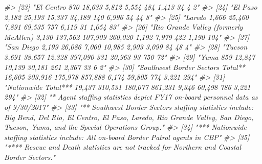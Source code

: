 \documentclass[
  12pt,
]{book}
\newenvironment{Shaded}{\begin{snugshade}}{\end{snugshade}}
\newcommand{\CommentTok}[1]{\textcolor[rgb]{0.37,0.37,0.37}{\textit{#1}}}
\begin{document}
\begin{Shaded}
\begin{Highlighting}[]
\CommentTok{\#\textgreater{} [23] "El Centro                                         870              18,633                    5,812                   5,554             484             1,413             34             4      2"    }
\CommentTok{\#\textgreater{} [24] "El Paso                                          2,182             25,193                   15,337                  34,189             140             6,996             54            44      8"    }
\CommentTok{\#\textgreater{} [25] "Laredo                                           1,666             25,460                    7,891                  69,535             757             6,119             31          1,054    83"    }
\CommentTok{\#\textgreater{} [26] "Rio Grande Valley (formerly McAllen)             3,130            137,562                  107,909                260,020             1,192            7,979            422          1,190   104"    }
\CommentTok{\#\textgreater{} [27] "San Diego                                        2,199             26,086                    7,060                  10,985            2,903            3,099             84            48      4"    }
\CommentTok{\#\textgreater{} [28] "Tucson                                           3,691             38,657                   12,328                397,090              331            20,963             93           750     72"    }
\CommentTok{\#\textgreater{} [29] "Yuma                                              859              12,847                   10,139                  30,181             261             2,367             33             6      2"    }
\CommentTok{\#\textgreater{} [30] "Southwest Border Sectors Total**                16,605            303,916                  175,978                857,888             6,174           59,805            774          3,221   294"    }
\CommentTok{\#\textgreater{} [31] "Nationwide Total***                             19,437            310,531                  180,077                861,231             9,346           60,498            786          3,221   294"    }
\CommentTok{\#\textgreater{} [32] "* Agent staffing statistics depict FY17 on{-}board personnel data as of 9/30/2017"                                                                                                                     }
\CommentTok{\#\textgreater{} [33] "** Southwest Border Sectors staffing statistics include: Big Bend, Del Rio, El Centro, El Paso, Laredo, Rio Grande Valley, San Diego, Tucson, Yuma, and the Special Operations Group."               }
\CommentTok{\#\textgreater{} [34] "*** Nationwide staffing statistics include: All on{-}board Border Patrol agents in CBP"                                                                                                                }
\CommentTok{\#\textgreater{} [35] "**** Rescue and Death statistics are not tracked for Northern and Coastal Border Sectors."}
\end{Highlighting}
\end{Shaded}
\end{document}
